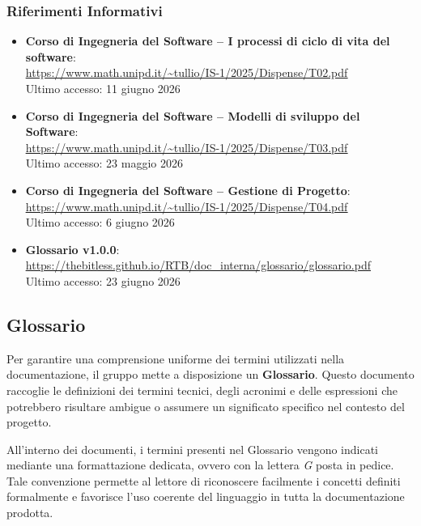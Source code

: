 \documentclass[a4paper, 10pt, colorlinks=true, linkcolor=black, urlcolor=blue, citecolor=blue, hidelinks]{article}
\newcommand{\reflink}[1]{{\footnotesize\underline{\url{#1}}}}
\begin{document}
\subsubsection{Riferimenti Informativi}
\begin{itemize}
    \item \textbf{Corso di Ingegneria del Software -- I processi di ciclo di vita del software}: \\
    \reflink{https://www.math.unipd.it/~tullio/IS-1/2025/Dispense/T02.pdf} \\
    Ultimo accesso: 11 giugno 2026

    \item \textbf{Corso di Ingegneria del Software -- Modelli di sviluppo del Software}: \\
    \reflink{https://www.math.unipd.it/~tullio/IS-1/2025/Dispense/T03.pdf} \\
    Ultimo accesso: 23 maggio 2026

    \item \textbf{Corso di Ingegneria del Software -- Gestione di Progetto}: \\
    \reflink{https://www.math.unipd.it/~tullio/IS-1/2025/Dispense/T04.pdf} \\
    Ultimo accesso: 6 giugno 2026

    \item \textbf{Glossario v1.0.0}: \\
    \reflink{https://thebitless.github.io/RTB/doc_interna/glossario/glossario.pdf} \\
    Ultimo accesso: 23 giugno 2026
\end{itemize}

\subsection{Glossario}

Per garantire una comprensione uniforme dei termini utilizzati nella documentazione, il gruppo mette a disposizione un \textbf{Glossario}. Questo documento raccoglie le definizioni dei termini tecnici, degli acronimi e delle espressioni che potrebbero risultare ambigue o assumere un significato specifico nel contesto del progetto.

All'interno dei documenti, i termini presenti nel Glossario vengono indicati mediante una formattazione dedicata, ovvero con la lettera \textit{G} posta in pedice. Tale convenzione permette al lettore di riconoscere facilmente i concetti definiti formalmente e favorisce l'uso coerente del linguaggio in tutta la documentazione prodotta.
\end{document}
